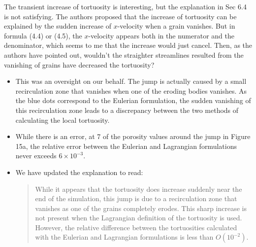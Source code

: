 \documentclass[11pt]{article}
\newcommand{\comment}[1]{{\color{blue} #1}}
\begin{document}
\noindent
\comment{The transient increase of tortuosity is interesting, but the
explanation in Sec 6.4 is not satisfying. The authors proposed that the
increase of tortuosity can be explained by the sudden increase of
$x$-velocity when a grain vanishes. But in formula (4.4) or (4.5), the
$x$-velocity appears both in the numerator and the denominator, which
seems to me that the increase would just cancel. Then, as the authors
have pointed out, wouldn't the straighter streamlines resulted from the
vanishing of grains have decreased the tortuosity?}
\begin{itemize}
  \item This was an oversight on our behalf. The jump is actually caused
    by a small recirculation zone that vanishes when one of the eroding
    bodies vanishes. As the blue dots correspond to the Eulerian
    formulation, the sudden vanishing of this recirculation zone leads
    to a discrepancy between the two methods of calculating the local
    tortuosity.

  \item  While there is an error, at 7 of the porosity values around the
    jump in Figure 15a, the relative error between the Eulerian and
    Lagrangian formulations never exceeds $6 \times 10^{-3}$.

  \item We have updated the explanation to read:
    \begin{quotation}
      \noindent
      While it appears that the tortuosity does increase suddenly near
      the end of the simulation, this jump is due to a recirculation
      zone that vanishes as one of the grains completely erodes. This
      sharp increase is not present when the Lagrangian definition of
      the tortuosity is used. However, the relative difference between
      the tortuosities calculated with the Eulerian and Lagrangian
      formulations is less than $O(10^{-2})$.
    \end{quotation}
\end{itemize}
\end{document}
